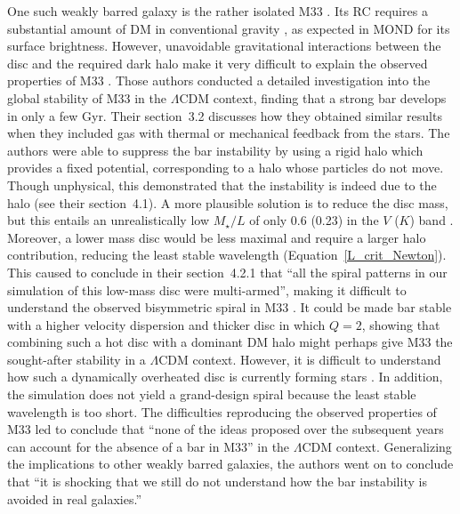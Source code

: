 \documentclass[fleqn,usenatbib,useAMS,onecolumn]{mnras} %
\begin{document}
One such weakly barred galaxy is the rather isolated M33 \citep{Corbelli_Walterbos_2007, Kam_2015}. Its RC requires a substantial amount of DM in conventional gravity \citep{Sanders_1996, Famaey_McGaugh_2012, Kam_2017}, as expected in MOND for its surface brightness. However, unavoidable gravitational interactions between the disc and the required dark halo make it very difficult to explain the observed properties of M33 \citep*{Sellwood_2019}. Those authors conducted a detailed investigation into the global stability of M33 in the $\Lambda$CDM context, finding that a strong bar develops in only a few Gyr. Their section~3.2 discusses how they obtained similar results when they included gas with thermal or mechanical feedback from the stars. The authors were able to suppress the bar instability by using a rigid halo which provides a fixed potential, corresponding to a halo whose particles do not move. Though unphysical, this demonstrated that the instability is indeed due to the halo (see their section~4.1). A more plausible solution is to reduce the disc mass, but this entails an unrealistically low $M_{\star}/L$ of only 0.6 (0.23) in the $V$ ($K$) band \citep{Conroy_2013, Schombert_2018}. Moreover, a lower mass disc would be less maximal and require a larger halo contribution, reducing the least stable wavelength (Equation~\ref{L_crit_Newton}). This caused \citet{Sellwood_2019} to conclude in their section~4.2.1 that ``all the spiral patterns in our simulation of this low-mass disc were multi-armed'', making it difficult to understand the observed bisymmetric spiral in M33 \citep{Smith_1984, Elmegreen_1992, Regan_Vogel_1994, Jarrett_2003, Corbelli_Walterbos_2007}. It could be made bar stable with a higher velocity dispersion and thicker disc in which $Q = 2$, showing that combining such a hot disc with a dominant DM halo might perhaps give M33 the sought-after stability in a $\Lambda$CDM context. However, it is difficult to understand how such a dynamically overheated disc is currently forming stars \citep{Verley_2009}. In addition, the simulation does not yield a grand-design spiral because the least stable wavelength is too short. The difficulties reproducing the observed properties of M33 led \citet{Sellwood_2019} to conclude that ``none of the ideas proposed over the subsequent years can account for the absence of a bar in M33'' in the $\Lambda$CDM context. Generalizing the implications to other weakly barred galaxies, the authors went on to conclude that ``it is shocking that we still do not understand how the bar instability is avoided in real galaxies.''
\end{document}
